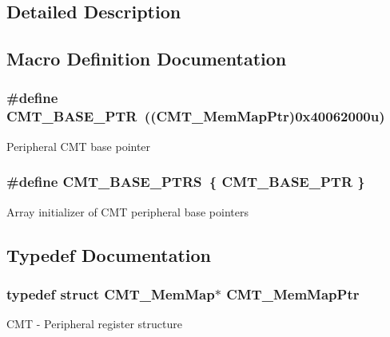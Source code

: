 \subsection{Detailed Description}


\subsection{Macro Definition Documentation}
\hypertarget{group___c_m_t___peripheral_gae361f199741d5276c4618edb9ee289b7}{}
\subsubsection[{C\+M\+T\+\_\+\+B\+A\+S\+E\+\_\+\+P\+T\+R}]{\setlength{\rightskip}{0pt plus 5cm}\#define C\+M\+T\+\_\+\+B\+A\+S\+E\+\_\+\+P\+T\+R~(({\bf C\+M\+T\+\_\+\+Mem\+Map\+Ptr})0x40062000u)}\label{group___c_m_t___peripheral_gae361f199741d5276c4618edb9ee289b7}
Peripheral C\+M\+T base pointer \hypertarget{group___c_m_t___peripheral_gad58e606f11af35440c1b77ff05b55874}{}
\subsubsection[{C\+M\+T\+\_\+\+B\+A\+S\+E\+\_\+\+P\+T\+R\+S}]{\setlength{\rightskip}{0pt plus 5cm}\#define C\+M\+T\+\_\+\+B\+A\+S\+E\+\_\+\+P\+T\+R\+S~\{ {\bf C\+M\+T\+\_\+\+B\+A\+S\+E\+\_\+\+P\+T\+R} \}}\label{group___c_m_t___peripheral_gad58e606f11af35440c1b77ff05b55874}
Array initializer of C\+M\+T peripheral base pointers 

\subsection{Typedef Documentation}
\hypertarget{group___c_m_t___peripheral_ga9764155d28e775ee5d3200941c07f812}{}
\subsubsection[{C\+M\+T\+\_\+\+Mem\+Map\+Ptr}]{\setlength{\rightskip}{0pt plus 5cm}typedef struct {\bf C\+M\+T\+\_\+\+Mem\+Map}$\ast$ {\bf C\+M\+T\+\_\+\+Mem\+Map\+Ptr}}\label{group___c_m_t___peripheral_ga9764155d28e775ee5d3200941c07f812}
C\+M\+T -\/ Peripheral register structure 